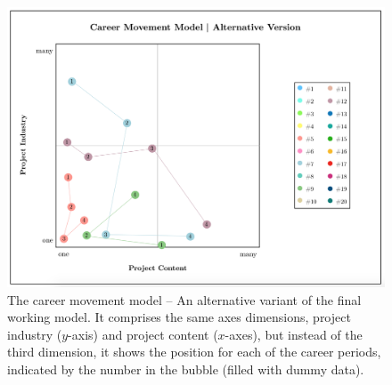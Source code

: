 \begin{figure}[!hbt]
    \captionsetup{font=small}
  \centering
  \includegraphics[width=.7\columnwidth]{figures/WM_alternate.png}
  \caption[The career movement model]{The career movement model – An alternative variant of the final working model. It comprises the same axes dimensions, project industry ($y$-axis) and project content ($x$-axes), but instead of the third dimension, it shows the position for each of the career periods, indicated by the number in the bubble (filled with dummy data).}
  \label{fig:alternate}
\end{figure}

